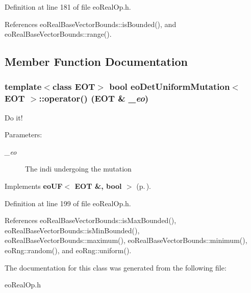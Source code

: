 Definition at line 181 of file eo\-Real\-Op.h.

References eo\-Real\-Base\-Vector\-Bounds::is\-Bounded(), and eo\-Real\-Base\-Vector\-Bounds::range().

\subsection{Member Function Documentation}
\subsubsection{\setlength{\rightskip}{0pt plus 5cm}template$<$class EOT$>$ bool {\bf eo\-Det\-Uniform\-Mutation}$<$ {\bf EOT} $>$::operator() ({\bf EOT} \& {\em \_\-eo})\hspace{0.3cm}{\tt  [inline, virtual]}}\label{classeo_det_uniform_mutation_a4}


Do it! 

\begin{Desc}
\item[Parameters:]
\begin{description}
\item[{\em \_\-eo}]The indi undergoing the mutation \end{description}
\end{Desc}


Implements {\bf eo\-UF$<$ EOT \&, bool $>$} {\rm (p.\,\pageref{classeo_u_f_a1})}.

Definition at line 199 of file eo\-Real\-Op.h.

References eo\-Real\-Base\-Vector\-Bounds::is\-Max\-Bounded(), eo\-Real\-Base\-Vector\-Bounds::is\-Min\-Bounded(), eo\-Real\-Base\-Vector\-Bounds::maximum(), eo\-Real\-Base\-Vector\-Bounds::minimum(), eo\-Rng::random(), and eo\-Rng::uniform().

The documentation for this class was generated from the following file:\begin{CompactItemize}
\item 
eo\-Real\-Op.h\end{CompactItemize}
